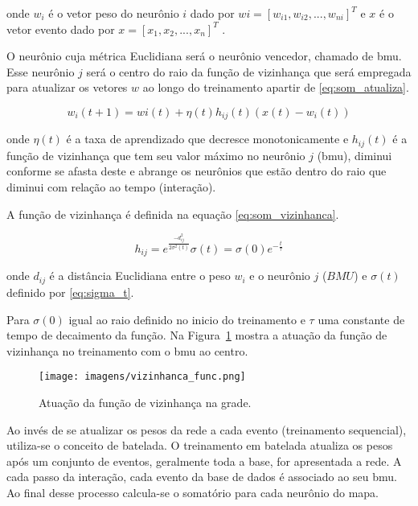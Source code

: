 \noindent onde $w_{i}$ é o vetor peso do neurônio $i$ dado por $wi =
[w_{i1},w_{i2},...,w_{ni}]^{T}$ e $x$ é o vetor evento dado por $x =
[x_{1},x_{2},...,x_{n}]^{T}$ . 

O neurônio cuja métrica Euclidiana será o neurônio
vencedor, chamado de \gls{bmu}. Esse neurônio
$j$ será o centro do raio da função de vizinhança que será empregada
para atualizar os vetores $w$ ao longo do treinamento apartir de
\ref{eq:som_atualiza}.

\begin{equation}\label{eq:som_atualiza}
w_{i}(t+1)=w{i}(t)+\eta(t)h_{ij}(t)(x(t)-w_{i}(t))
\end{equation}

\noindent onde $\eta(t)$ é a taxa de aprendizado que decresce monotonicamente e
$h_{ij}(t)$ é a função de vizinhança que tem seu valor máximo no
neurônio $j$ (\acs{bmu}), diminui conforme se afasta deste e abrange os
neurônios que estão dentro do raio que diminui com relação ao tempo
(interação). 

A função de vizinhança é definida na equação \ref{eq:som_vizinhanca}.

\begin{subequations}
\begin{equation}\label{eq:som_vizinhanca}
h_{ij}=e^{\frac{-d_{ij}^{2}}{2\sigma^{2}(t)}}
\end{equation}
\begin{equation}\label{eq:sigma_t}
\sigma(t)=\sigma(0)e^{{-\frac{t}{\tau}}}
\end{equation}
\end{subequations}

\noindent onde $d_{ij}$ é a distância Euclidiana entre o peso $w_{i}$ e o
neurônio $j$ ($BMU$) e $\sigma(t)$ definido por \ref{eq:sigma_t}.

Para $\sigma(0)$ igual ao raio definido no inicio do treinamento e
$\tau$ uma constante de tempo de decaimento da função. Na
Figura~\ref{fig:vizinhanca_grade} mostra a atuação da função de
vizinhança no treinamento com o \acs{bmu} ao centro.

\begin{figure}[h!tb]
\centering
\texttt{[image: imagens/vizinhanca\_func.png]}
\caption{Atuação da função de vizinhança na grade.}
\label{fig:vizinhanca_grade}
\end{figure}

Ao invés de se atualizar os pesos da rede a cada evento (treinamento
sequencial), utiliza-se o conceito de batelada. O treinamento em
batelada atualiza os pesos após um conjunto de eventos, geralmente
toda a base, for apresentada a rede. A cada passo da interação, cada
evento da base de dados é associado ao seu \acs{bmu}. Ao final desse
processo calcula-se o somatório para cada neurônio do mapa.

